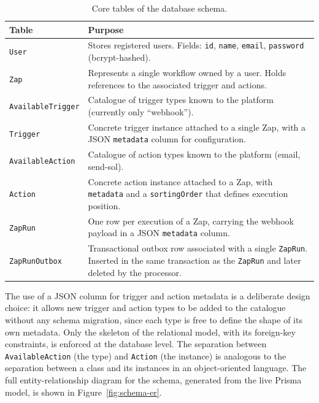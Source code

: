 \begin{table}[h]
\centering
\caption{Core tables of the database schema.}
\label{tab:schema}
\renewcommand{\arraystretch}{1.3}
\begin{tabular}{|p{3.2cm}|p{10cm}|}
\hline
\textbf{Table} & \textbf{Purpose} \\ \hline
\texttt{User} & Stores registered users. Fields: \texttt{id}, \texttt{name}, \texttt{email}, \texttt{password} (bcrypt-hashed). \\ \hline
\texttt{Zap} & Represents a single workflow owned by a user. Holds references to the associated trigger and actions. \\ \hline
\texttt{AvailableTrigger} & Catalogue of trigger types known to the platform (currently only ``webhook''). \\ \hline
\texttt{Trigger} & Concrete trigger instance attached to a single Zap, with a JSON \texttt{metadata} column for configuration. \\ \hline
\texttt{AvailableAction} & Catalogue of action types known to the platform (email, send-sol). \\ \hline
\texttt{Action} & Concrete action instance attached to a Zap, with \texttt{metadata} and a \texttt{sortingOrder} that defines execution position. \\ \hline
\texttt{ZapRun} & One row per execution of a Zap, carrying the webhook payload in a JSON \texttt{metadata} column. \\ \hline
\texttt{ZapRunOutbox} & Transactional outbox row associated with a single \texttt{ZapRun}. Inserted in the same transaction as the \texttt{ZapRun} and later deleted by the processor. \\ \hline
\end{tabular}
\end{table}

The use of a JSON column for trigger and action metadata is a deliberate design choice: it allows new trigger and action types to be added to the catalogue without any schema migration, since each type is free to define the shape of its own metadata. Only the skeleton of the relational model, with its foreign-key constraints, is enforced at the database level. The separation between \texttt{AvailableAction} (the type) and \texttt{Action} (the instance) is analogous to the separation between a class and its instances in an object-oriented language. The full entity-relationship diagram for the schema, generated from the live Prisma model, is shown in Figure~\ref{fig:schema-er}.

